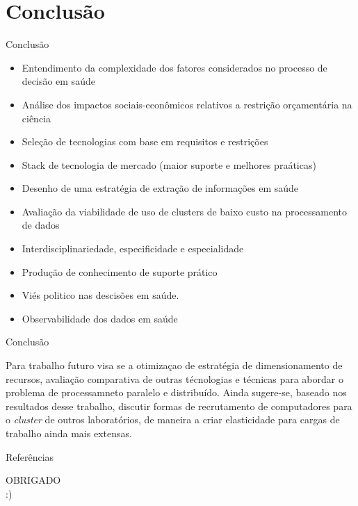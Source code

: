 \documentclass[10pt,brazil]{beamer}
\theoremstyle{definition}
\begin{document}
\section{Conclusão}

\begin{frame}{Conclusão}
  \begin{itemize}
    \item Entendimento da complexidade dos fatores considerados no processo de decisão em saúde
    \item Análise dos impactos sociais-econômicos relativos a restrição orçamentária na ciência
    \item Seleção de tecnologias com base em requisitos e restrições
    \item Stack de tecnologia de mercado (maior suporte e melhores praáticas)
    \item Desenho de uma estratégia de extração de informações em saúde
    \item Avaliação da viabilidade de uso de clusters de baixo custo na processamento de dados
    \item Interdisciplinariedade, especificidade e especialidade
    \item Produção de conhecimento de suporte prático 
    \item Viés politico nas descisões em saúde. 
    \item Observabilidade dos dados em saúde
  \end{itemize}
\end{frame}
\begin{frame}{Conclusão}
  
  Para trabalho futuro visa se a otimizaçao de estratégia de dimensionamento de recursos, avaliação comparativa de outras técnologias e técnicas para abordar o problema de processamneto paralelo e distribuído.
  Ainda sugere-se, baseado nos resultados desse trabalho, discutir formas de recrutamento de computadores para o \emph{cluster} de outros laboratórios, de maneira a criar elasticidade para cargas de trabalho ainda mais extensas.
\end{frame}


\begin{frame}[allowframebreaks]{Referências}
  \small
  
\end{frame}


\begin{frame}
  \centering
  {\color{ros} OBRIGADO\\
    :)}
\end{frame}
\end{document}
